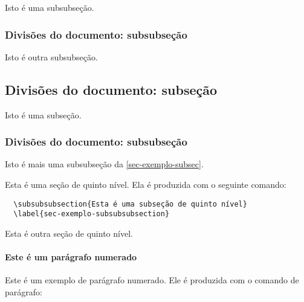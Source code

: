 \documentclass[12pt,oneside,a4paper,chapter=TITLE,
			   english,brazil]{abntex2}
\begin{document}
\begin{anexosenv}
Isto é uma subsubseção.

\subsubsection{Divisões do documento: subsubseção}

Isto é outra subsubseção.

\subsection{Divisões do documento: subseção}\label{sec-exemplo-subsec}

Isto é uma subseção.

\subsubsection{Divisões do documento: subsubseção}

Isto é mais uma subsubseção da \autoref{sec-exemplo-subsec}.


\label{sec-exemplo-subsubsubsection}

Esta é uma seção de quinto nível. Ela é produzida com o seguinte comando:
\begin{verbatim}
  \subsubsubsection{Esta é uma subseção de quinto nível}
  \label{sec-exemplo-subsubsubsection}
\end{verbatim}

\label{sec-exemplo-subsubsubsection-outro}

Esta é outra seção de quinto nível.

\paragraph{Este é um parágrafo numerado}\label{sec-exemplo-paragrafo}

Este é um exemplo de parágrafo numerado. Ele é produzida com o comando de parágrafo:
\begin{verbatim}

\end{verbatim}
\end{anexosenv}
\end{document}
